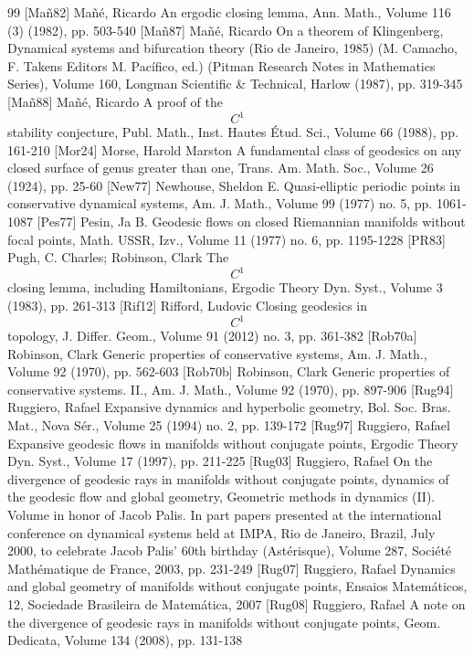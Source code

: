 \begin{thebibliography}{99}
 [Mañ82] Mañé, Ricardo An ergodic closing lemma, Ann. Math., Volume 116 (3) (1982), pp. 503-540
 [Mañ87] Mañé, Ricardo On a theorem of Klingenberg, Dynamical systems and bifurcation theory (Rio de Janeiro, 1985) (M. Camacho, F. Takens Editors M. Pacífico, ed.) (Pitman Research Notes in Mathematics Series), Volume 160, Longman Scientific \& Technical, Harlow (1987), pp. 319-345
 [Mañ88] Mañé, Ricardo A proof of the $${C}^1$$ stability conjecture, Publ. Math., Inst. Hautes Étud. Sci., Volume 66 (1988), pp. 161-210
 [Mor24] Morse, Harold Marston A fundamental class of geodesics on any closed surface of genus greater than one, Trans. Am. Math. Soc., Volume 26 (1924), pp. 25-60
 [New77] Newhouse, Sheldon E. Quasi-elliptic periodic points in conservative dynamical systems, Am. J. Math., Volume 99 (1977) no. 5, pp. 1061-1087
 [Pes77] Pesin, Ja B. Geodesic flows on closed Riemannian manifolds without focal points, Math. USSR, Izv., Volume 11 (1977) no. 6, pp. 1195-1228
 [PR83] Pugh, C. Charles; Robinson, Clark The $${C}^{1}$$ closing lemma, including Hamiltonians, Ergodic Theory Dyn. Syst., Volume 3 (1983), pp. 261-313
 [Rif12] Rifford, Ludovic Closing geodesics in $${C}^{1}$$ topology, J. Differ. Geom., Volume 91 (2012) no. 3, pp. 361-382
 [Rob70a] Robinson, Clark Generic properties of conservative systems, Am. J. Math., Volume 92 (1970), pp. 562-603
 [Rob70b] Robinson, Clark Generic properties of conservative systems. II., Am. J. Math., Volume 92 (1970), pp. 897-906
 [Rug94] Ruggiero, Rafael Expansive dynamics and hyperbolic geometry, Bol. Soc. Bras. Mat., Nova Sér., Volume 25 (1994) no. 2, pp. 139-172
 [Rug97] Ruggiero, Rafael Expansive geodesic flows in manifolds without conjugate points, Ergodic Theory Dyn. Syst., Volume 17 (1997), pp. 211-225
 [Rug03] Ruggiero, Rafael On the divergence of geodesic rays in manifolds without conjugate points, dynamics of the geodesic flow and global geometry, Geometric methods in dynamics (II). Volume in honor of Jacob Palis. In part papers presented at the international conference on dynamical systems held at IMPA, Rio de Janeiro, Brazil, July 2000, to celebrate Jacob Palis’ 60th birthday (Astérisque), Volume 287, Société Mathématique de France, 2003, pp. 231-249
 [Rug07] Ruggiero, Rafael Dynamics and global geometry of manifolds without conjugate points, Ensaios Matemáticos, 12, Sociedade Brasileira de Matemática, 2007
 [Rug08] Ruggiero, Rafael A note on the divergence of geodesic rays in manifolds without conjugate points, Geom. Dedicata, Volume 134 (2008), pp. 131-138
\end{thebibliography}
